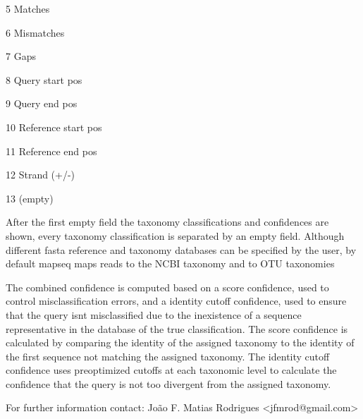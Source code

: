 \documentclass[10pt,a4paper]{article}
\begin{document}
5       Matches

6       Mismatches

7       Gaps

8       Query start pos

9       Query end pos

10      Reference start pos

11      Reference end pos

12      Strand (+/-)

13      (empty)

After the first empty field the taxonomy classifications and confidences are shown, every taxonomy classification is separated by an empty field.
Although different fasta reference and taxonomy databases can be specified by the user, by default mapseq maps reads to the NCBI taxonomy and to OTU taxonomies

The combined confidence is computed based on a score confidence, used to control misclassification errors, and a identity cutoff confidence, used to ensure that the query isnt misclassified due to the inexistence of a sequence representative in the database of the true classification. The score confidence is
calculated by comparing the identity of the assigned taxonomy to the identity of the first sequence not matching the assigned taxonomy.
The identity cutoff confidence uses preoptimized cutoffs at each taxonomic level to calculate the confidence that the query is not too divergent from the assigned taxonomy.


For further information contact: Jo\~ao F. Matias Rodrigues {\textless}jfmrod@gmail.com\textgreater
\end{document}
